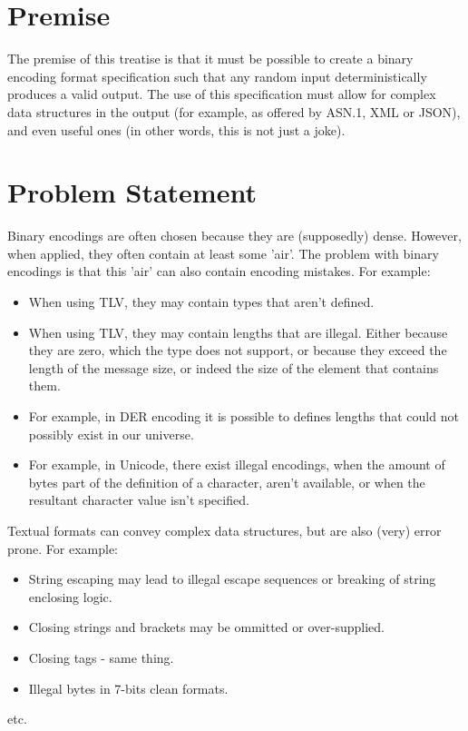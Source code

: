\section{Premise}

The premise of this treatise is that it must be possible to create
a binary encoding format specification such that any random input 
deterministically produces a valid output.
The use of this specification must allow for complex data structures
in the output (for example, as offered by ASN.1, XML or JSON),
and even useful ones (in other words, this is not just a joke).

\section{Problem Statement}

Binary encodings are often chosen because they are (supposedly) dense.
However, when applied, they often contain at least some 'air'.
The problem with binary encodings is that this 'air' can also contain
encoding mistakes. For example:

\begin{itemize}
\item When using TLV, they may contain types that aren't defined.
\item When using TLV, they may contain lengths that are illegal.
  Either because they are zero, which the type does not support,
  or because they exceed the length of the message size, or indeed
  the size of the element that contains them.
\item For example, in DER encoding it is possible to defines lengths
  that could not possibly exist in our universe.
\item For example, in Unicode, there exist illegal encodings, when the
  amount of bytes part of the definition of a character, aren't
  available, or when the resultant character value isn't specified.
\end{itemize}

Textual formats can convey complex data structures, but are also
(very) error prone. For example:

\begin{itemize}
\item String escaping may lead to illegal escape sequences or breaking
  of string enclosing logic.
\item Closing strings and brackets may be ommitted or over-supplied.
\item Closing tags - same thing.
\item Illegal bytes in 7-bits clean formats.
\end{itemize}
etc.


